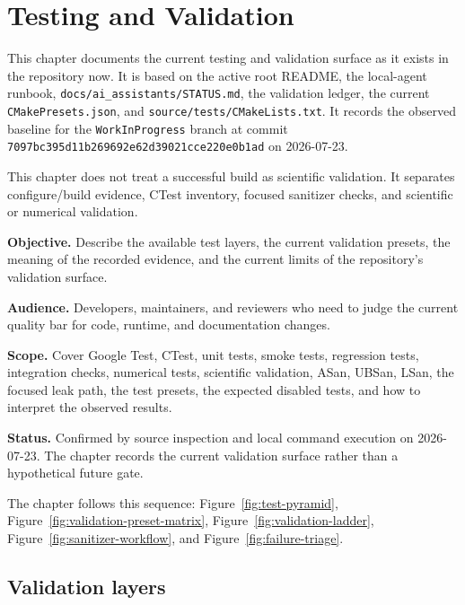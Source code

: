 \chapter{Testing and Validation}
\label{chap:testing-and-validation}

This chapter documents the current testing and validation surface as it exists
in the repository now. It is based on the active root README, the local-agent
runbook, \texttt{docs/ai\_assistants/STATUS.md}, the validation ledger, the
current \texttt{CMakePresets.json}, and \texttt{source/tests/CMakeLists.txt}.
It records the observed baseline for the \texttt{WorkInProgress} branch at
commit \texttt{7097bc395d11b269692e62d39021cce220e0b1ad} on 2026-07-23.

This chapter does not treat a successful build as scientific validation. It
separates configure/build evidence, CTest inventory, focused sanitizer checks,
and scientific or numerical validation.

\noindent\textbf{Objective.} Describe the available test layers, the current
validation presets, the meaning of the recorded evidence, and the current
limits of the repository's validation surface.

\noindent\textbf{Audience.} Developers, maintainers, and reviewers who need to
judge the current quality bar for code, runtime, and documentation changes.

\noindent\textbf{Scope.} Cover Google Test, CTest, unit tests, smoke tests,
regression tests, integration checks, numerical tests, scientific validation,
ASan, UBSan, LSan, the focused leak path, the test presets, the expected
disabled tests, and how to interpret the observed results.

\noindent\textbf{Status.} Confirmed by source inspection and local command
execution on 2026-07-23. The chapter records the current validation surface
rather than a hypothetical future gate.

The chapter follows this sequence:
Figure~\ref{fig:test-pyramid},
Figure~\ref{fig:validation-preset-matrix},
Figure~\ref{fig:validation-ladder},
Figure~\ref{fig:sanitizer-workflow}, and
Figure~\ref{fig:failure-triage}.

\section{Validation layers}
\label{sec:test-validation-layers}

